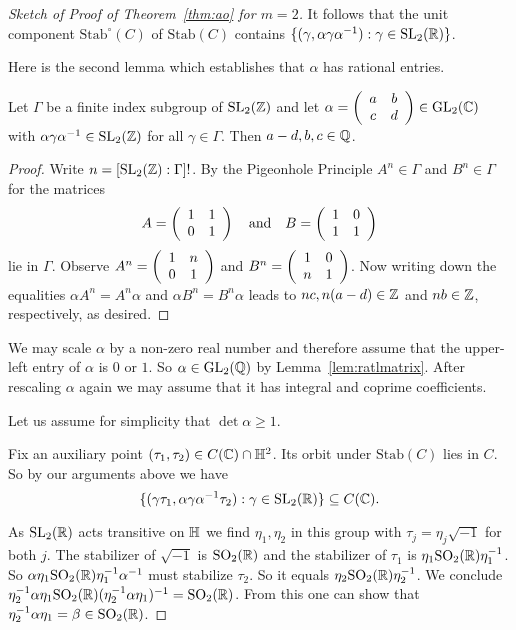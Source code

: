 \begin{proof}[Sketch of Proof of Theorem~\ref{thm:ao} for $m=2$]
  It follows that the unit component $\mathrm{Stab}^\circ(C)$ of
  $\mathrm{Stab}(C)$
  contains
  $\{(\gamma,\alpha\gamma\alpha^{-1}) : \gamma \in\mathrm{SL}_2({\mathbb{R}})
  \}$.

  Here is the second lemma which establishes that $\alpha$ has
  rational entries. 

  \begin{lemma}
    \label{lem:ratlmatrix}
    Let $\Gamma$ be a finite index subgroup of $\mathrm{SL}_2({\mathbb{Z}})$
    and let $\alpha=\left( \begin{array}{cc} {a} & {b} \\ {c} & {d} \end{array} \right)\in \mathrm{GL}_2({\mathbb{C}})$ with
    $\alpha\gamma\alpha^{-1}\in\mathrm{SL}_2({\mathbb{Z}})$ for all
    $\gamma\in\Gamma$. Then $a-d,b,c\in{\mathbb{Q}}$. 
  \end{lemma}
  \begin{proof}
    Write $n=[\mathrm{SL}_2({\mathbb{Z}}):\Gamma]!$. By the
    Pigeonhole Principle $A^n\in\Gamma$ and $B^n\in\Gamma$ for the  matrices
    \begin{equation*}
      A=\left( \begin{array}{cc} {1} & {1} \\ {0} & {1} \end{array} \right)
      \quad\text{and}\quad
      B=\left( \begin{array}{cc} {1} & {0} \\ {1} & {1} \end{array} \right)
    \end{equation*}
    lie in $\Gamma$. Observe
    $A^n = \left( \begin{array}{cc} {1} & {n} \\ {0} & {1} \end{array} \right)$ and $B^n=\left( \begin{array}{cc} {1} & {0} \\ {n} & {1} \end{array} \right)$.
    Now writing down the equalities 
    $\alpha A^n= A^n\alpha$ and $\alpha B^n=B^n\alpha$ leads to
    $nc,n(a-d)\in{\mathbb{Z}}$ and $nb\in{\mathbb{Z}}$, respectively, as desired. 
  \end{proof}

  We may scale $\alpha$ by a non-zero real number and therefore assume
  that the upper-left entry of $\alpha$ is $0$ or $1$. So $\alpha\in
  \mathrm{GL}_2({\mathbb{Q}})$ by Lemma~\ref{lem:ratlmatrix}.
  After rescaling
  $\alpha$ again we may assume that it has integral and coprime
  coefficients.

  Let us assume for simplicity that $\det \alpha \ge 1$. 

  Fix an auxiliary point $(\tau_1,\tau_2)\in C({\mathbb{C}})\cap {\mathbb{H}}^2$. Its
  orbit under $\mathrm{Stab}(C)$ lies in $C$. So by our arguments
  above we have
  \begin{equation}
    \label{eq:stabilizerincurve}
    \{(\gamma\tau_1,\alpha\gamma\alpha^{-1}\tau_2) : \gamma \in \mathrm{SL}_2({\mathbb{R}})\}
    \subseteq C({\mathbb{C}}). 
  \end{equation}

  As $\mathrm{SL}_2({\mathbb{R}})$ acts transitive on ${\mathbb{H}}$ we find
  $\eta_1,\eta_2$ in this group with $\tau_j = \eta_j \sqrt{-1}$ for
  both $j$. The stabilizer of $\sqrt{-1}$ is  $\mathrm{SO}_2({\mathbb{R}})$ and
  the stabilizer of $\tau_1$ is $\eta_1\mathrm{SO}_2({\mathbb{R}})\eta_1^{-1}$. So
  $\alpha \eta_1\mathrm{SO}_2({\mathbb{R}}) \eta_1^{-1} \alpha^{-1}$ must stabilize
  $\tau_2$. So it equals $\eta_2\mathrm{SO}_2({\mathbb{R}})\eta_2^{-1}$.
  We conclude $\eta_2^{-1}\alpha\eta_1 \mathrm{SO}_2({\mathbb{R}})
  (\eta_2^{-1}\alpha\eta_1)^{-1} = \mathrm{SO}_2({\mathbb{R}})$. From this one can
  show that $\eta_2^{-1}\alpha\eta_1=\beta\in \mathrm{SO}_2({\mathbb{R}})$.
  

\end{proof}
